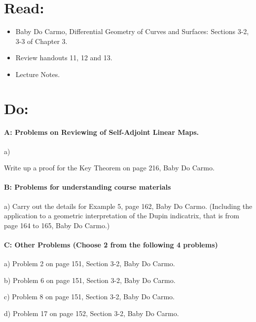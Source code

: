 \documentclass[12pt]{article}
\title{\rightline {\Huge {Due: Wednesday, October 17}}}
\author{\LARGE {HMC\quad Math 142 \quad Fall 2017} 
\\ {Prof. Gu}  
\\ {\LARGE Problem Set 7}}
\date{Start this assignment as soon as possible!}
\begin{document}
\maketitle

\section*{ Read: } 

\begin{itemize}
\item{Baby Do Carmo, Differential Geometry
    of Curves and Surfaces:  
Sections 3-2, 3-3 of Chapter 3.}
\item{ Review handouts 11, 12 and 13. }
\item{Lecture Notes.}
\end{itemize}

\section*{ Do: }
\paragraph{A: Problems on Reviewing of Self-Adjoint Linear Maps.}
\begin{itemize}
{\item a) } Write up a proof for the Key Theorem on page 216, Baby Do
Carmo.

\end{itemize}

\medskip
\paragraph{B: Problems for understanding course materials}

\begin{itemize}
{\item a) Carry out the details for Example 5, page 162, Baby Do
  Carmo.  (Including the application to a geometric interpretation 
of the Dupin indicatrix, that is from page 164 to 165, Baby Do Carmo.)} 
\end{itemize}

\paragraph{C: Other Problems (Choose 2 from the following 4 problems)}
\begin{itemize}

{\item a) Problem 2 on page 151, Section 3-2, Baby Do Carmo.}
{\item b) Problem 6 on page 151, Section 3-2, Baby Do Carmo.}
{\item c) Problem 8 on page 151, Section 3-2, Baby Do Carmo.}
{\item d) Problem 17 on page 152, Section 3-2, Baby Do Carmo.}

\end{itemize}
\end{document}
